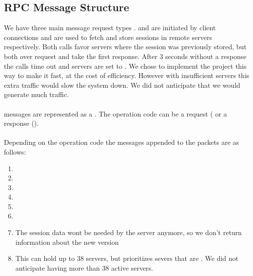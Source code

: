 \documentclass[11pt,letterpaper]{article}
\begin{document}
\subsection{RPC Message Structure}
We have three main message request types .  and  are initiated by client connections and are used to fetch and store sessions in remote servers respectively. Both calls favor servers where the session was previously stored, but both over request and take the first response. After 3 seconds without a response the calls time out and servers are set to . We chose to implement the project this way to make it fast, at the cost of efficiency. However with insufficient servers this extra traffic would slow the system down. We did not anticipate that we would generate much traffic.
\\
\\
 messages are represented as a . The operation code can be a request ( or a response (). 
\\
\\
Depending on the operation code the messages appended to the  packets are as follows:
\begin{enumerate}
\item {}
\item {}
\item {}
\item {}
\item {}
\item {}
\item {} The session data wont be needed by the server anymore, so we don't return information about the new version
\item {} This can hold up to 38 servers, but prioritizes severs that are . We did not anticipate having more than 38 active servers.
\end{enumerate}
\\
\\
\end{document}
